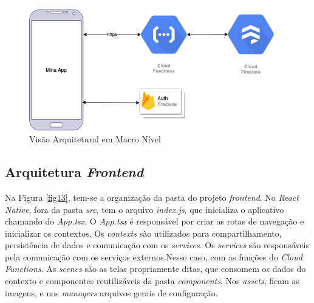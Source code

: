 \begin{figure}[ht]
	\caption{Visão Arquitetural em Macro Nível}
	\begin{center}
	\includegraphics[keepaspectratio=true,scale=0.6]{figuras/architecture.png}
	\end{center}
    \label{fig12}
\end{figure}

\subsection{Arquitetura \emph{Frontend}}

Na Figura \ref{fig13}, tem-se a organização da pasta do projeto \emph{frontend}. No \emph{React Native}, fora 
da pasta \emph{src}, tem o arquivo \emph{index.js}, que inicializa o aplicativo chamando do \emph{App.tsx}. 
O \emph{App.tsx} é responsável 
por criar as rotas de navegação e inicializar os contextos. Os \emph{contexts} são utilizados 
para compartilhamento, 
persistência de dados e comunicação com os \emph{services}. Os \emph{services} são responsáveis pela 
comunicação com 
os serviços externos.Nesse caso, com as funções do \emph{Cloud Functions}. As \emph{scenes} são as 
telas propriamente ditas, 
que consomem os dados do contexto e componentes reutilizáveis da pasta \emph{components}. 
Nos \emph{assets}, ficam as imagens, e 
nos \emph{managers} arquivos gerais de configuração. 


